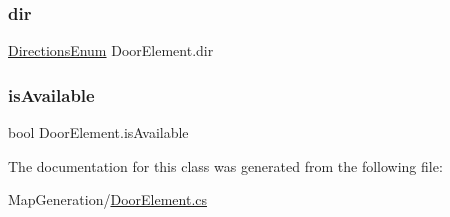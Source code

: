 \subsubsection{\texorpdfstring{dir}{dir}}
{\footnotesize\ttfamily \mbox{\hyperlink{_directions_enum_8cs_a6bd1f747985f3fcfa3faca85ff3fd8e8}{Directions\+Enum}} Door\+Element.\+dir}

\mbox{\label{class_door_element_a987868b29274de148a1399cc43a497aa}} 
\subsubsection{\texorpdfstring{is\+Available}{isAvailable}}
{\footnotesize\ttfamily bool Door\+Element.\+is\+Available}



The documentation for this class was generated from the following file\+:\begin{DoxyCompactItemize}
\item 
Map\+Generation/\mbox{\hyperlink{_door_element_8cs}{Door\+Element.\+cs}}\end{DoxyCompactItemize}
